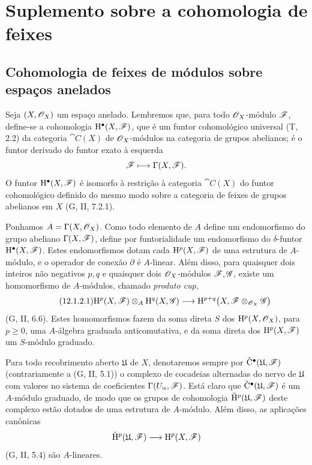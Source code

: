 \section{Suplemento sobre a cohomologia de feixes}
\label{section:0.12}

\subsection{Cohomologia de feixes de módulos sobre espaços anelados}
\label{subsection:0.12.1}

\begin{env}[12.1.1]
\label{0.12.1.1}
Seja $(X,\mathscr{O}_X)$ um espaço anelado.
Lembremos que, para todo $\mathscr{O}_X$-módulo $\mathscr{F}$, define-se a
cohomologia $\mathrm{H}^\bullet(X,\mathscr{F})$, que é um funtor cohomológico universal
(T, 2.2) da categoria $\cat{C}(X)$ de
$\mathscr{O}_X$-módulos na categoria de grupos abelianos; é o funtor derivado
do funtor exato à esquerda
\[
  \mathscr{F}\longmapsto\Gamma(X,\mathscr{F}).
\]
O funtor $\mathrm{H}^\bullet(X,\mathscr{F})$ é isomorfo
à restrição à categoria $\cat{C}(X)$ do funtor cohomológico
definido do mesmo modo sobre a categoria de feixes de grupos abelianos
em $X$ (G, II, 7.2.1).
\end{env}

\begin{env}[12.1.2]
\label{0.12.1.2}
Ponhamos $A=\Gamma(X,\mathscr{O}_X)$.
Como todo elemento de $A$ define um endomorfismo do grupo abeliano
$\Gamma(X,\mathscr{F})$, define por funtorialidade um endomorfismo do
$\delta$-funtor $\mathrm{H}^\bullet(X,\mathscr{F})$.
Estes endomorfismos dotam cada $\mathrm{H}^p(X,\mathscr{F})$ de uma
estrutura de $A$-módulo, e o operador de conexão $\partial$ é
$A$-linear.
Além disso, para quaisquer dois inteiros não negativos $p,q$ e quaisquer dois
$\mathscr{O}_X$-módulos $\mathscr{F},\mathscr{G}$, existe um homomorfismo de
$A$-módulos, chamado \emph{produto cup},
\[
\label{0.12.1.2.1}
\tag{12.1.2.1}
  \HH^p(X,\sh{F})\otimes_A\HH^q(X,\sh{G})
  \longrightarrow
  \HH^{p+q}\bigl(X,\sh{F}\otimes_{\sh{O}_X}\sh{G}\bigr)
\]
(G, II, 6.6).
Estes homomorfismos fazem da soma direta $S$ dos
$\mathrm{H}^p(X,\mathscr{O}_X)$, para $p\geq0$, uma $A$-álgebra graduada
anticomutativa, e da soma direta dos $\mathrm{H}^p(X,\mathscr{F})$ um
$S$-módulo graduado.

Para todo recobrimento aberto $\mathfrak{U}$ de $X$, denotaremos sempre
por $\check{\mathrm{C}}^\bullet(\mathfrak{U},\mathscr{F})$ (contrariamente a
(G, II, 5.1)) o complexo de cocadeias alternadas do nervo de
$\mathfrak{U}$ com valores no sistema de coeficientes
$\Gamma(U_\alpha,\mathscr{F})$.
Está claro que
$\check{\mathrm{C}}^\bullet(\mathfrak{U},\mathscr{F})$ é um
$A$-módulo graduado, de modo que os grupos de cohomologia
$\check{\mathrm{H}}^p(\mathfrak{U},\mathscr{F})$ deste complexo estão dotados de
uma estrutura de $A$-módulo.
Além disso, as aplicações canônicas
\[
  \check{\mathrm{H}}^p(\mathfrak{U},\mathscr{F})
  \longrightarrow
  \mathrm{H}^p(X,\mathscr{F})
\]
(G, II, 5.4) são $A$-lineares.
\end{env}

